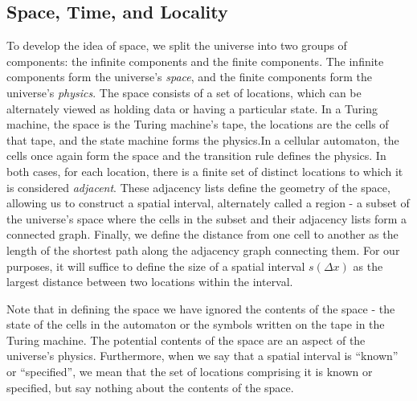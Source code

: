 \documentclass[12pt]{article}
\theoremstyle{definition}
\begin{document}

\subsection{Space, Time, and Locality}
\label{sec:locality}

To develop the idea of space, we split the universe into two groups of
components: the infinite components and the finite components. The infinite
components form the universe's \textit{space}, and the finite components form
the universe's \textit{physics}. The space consists of a set of locations, which
can be alternately viewed as holding data or having a particular state. In a
Turing machine, the space is the Turing machine's tape, the locations are the
cells of that tape, and the state machine forms the physics.\footnotemark In a
cellular automaton, the cells once again form the space and the transition rule
defines the physics. In both cases, for each location, there is a finite set of
distinct locations to which it is considered \textit{adjacent}. These adjacency
lists define the geometry of the space, allowing us to construct a spatial
interval, alternately called a region - a subset of the universe's space where
the cells in the subset and their adjacency lists form a connected graph.
Finally, we define the distance from one cell to another as the length of the
shortest path along the adjacency graph connecting them. For our purposes, it
will suffice to define the size of a spatial interval \(s(\Delta x)\) as the
largest distance between two locations within the interval.


Note that in defining the space we have ignored the contents of the space - the
state of the cells in the automaton or the symbols written on the tape in the
Turing machine. The potential contents of the space are an aspect of the
universe's physics. Furthermore, when we say that a spatial interval is
``known'' or ``specified'', we mean that the set of locations comprising it is
known or specified, but say nothing about the contents of the space.
\end{document}
